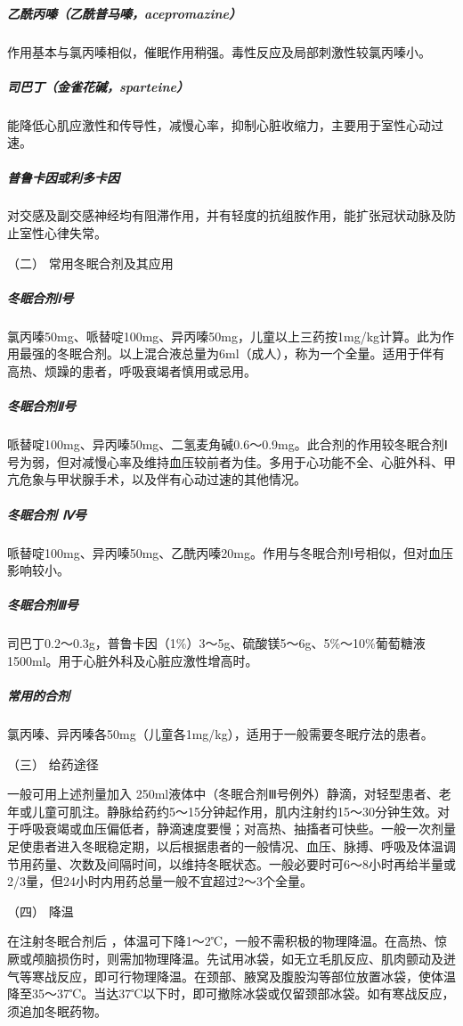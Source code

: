 \subparagraph{乙酰丙嗪（乙酰普马嗪，acepromazine）}

作用基本与氯丙嗪相似，催眠作用稍强。毒性反应及局部刺激性较氯丙嗪小。

\subparagraph{司巴丁（金雀花碱，sparteine）}

能降低心肌应激性和传导性，减慢心率，抑制心脏收缩力，主要用于室性心动过速。

\subparagraph{普鲁卡因或利多卡因}

对交感及副交感神经均有阻滞作用，并有轻度的抗组胺作用，能扩张冠状动脉及防止室性心律失常。

\hypertarget{text00388.htmlux5cux23CHP16-9-2-2}{}
（二） 常用冬眠合剂及其应用

\subparagraph{冬眠合剂Ⅰ号}

氯丙嗪50mg、哌替啶100mg、异丙嗪50mg，儿童以上三药按1mg/kg计算。此为作用最强的冬眠合剂。以上混合液总量为6ml（成人），称为一个全量。适用于伴有高热、烦躁的患者，呼吸衰竭者慎用或忌用。

\subparagraph{冬眠合剂Ⅱ号}

哌替啶100mg、异丙嗪50mg、二氢麦角碱0.6～0.9mg。此合剂的作用较冬眠合剂Ⅰ号为弱，但对减慢心率及维持血压较前者为佳。多用于心功能不全、心脏外科、甲亢危象与甲状腺手术，以及伴有心动过速的其他情况。

\subparagraph{冬眠合剂 Ⅳ号}

哌替啶100mg、异丙嗪50mg、乙酰丙嗪20mg。作用与冬眠合剂Ⅰ号相似，但对血压影响较小。

\subparagraph{冬眠合剂Ⅲ号}

司巴丁0.2～0.3g，普鲁卡因（1\%）3～5g、硫酸镁5～6g、5\%～10\%葡萄糖液1500ml。用于心脏外科及心脏应激性增高时。

\subparagraph{常用的合剂}

氯丙嗪、异丙嗪各50mg（儿童各1mg/kg），适用于一般需要冬眠疗法的患者。

\hypertarget{text00388.htmlux5cux23CHP16-9-2-3}{}
（三） 给药途径

一般可用上述剂量加入
250ml液体中（冬眠合剂Ⅲ号例外）静滴，对轻型患者、老年或儿童可肌注。静脉给药约5～15分钟起作用，肌内注射约15～30分钟生效。对于呼吸衰竭或血压偏低者，静滴速度要慢；对高热、抽搐者可快些。一般一次剂量足使患者进入冬眠稳定期，以后根据患者的一般情况、血压、脉搏、呼吸及体温调节用药量、次数及间隔时间，以维持冬眠状态。一般必要时可6～8小时再给半量或2/3量，但24小时内用药总量一般不宜超过2～3个全量。

\hypertarget{text00388.htmlux5cux23CHP16-9-2-4}{}
（四） 降温

在注射冬眠合剂后
，体温可下降1～2℃，一般不需积极的物理降温。在高热、惊厥或颅脑损伤时，则需加物理降温。先试用冰袋，如无立毛肌反应、肌肉颤动及迸气等寒战反应，即可行物理降温。在颈部、腋窝及腹股沟等部位放置冰袋，使体温降至35～37℃。当达37℃以下时，即可撤除冰袋或仅留颈部冰袋。如有寒战反应，须追加冬眠药物。

